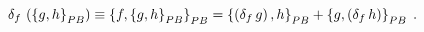 \begin{equation}
\delta_{f}\,\left(  \left\{  g,h\right\}  _{{\footnotesize PB}}\right)
\equiv\left\{  f,\left\{  g,h\right\}  _{{\footnotesize PB}}\right\}
_{{\footnotesize PB}}=\left\{  \left(  \delta_{f}\,g\right)  ,h\right\}
_{{\footnotesize PB}}+\left\{  g,\left(  \delta_{f}\,h\right)  \right\}
_{{\footnotesize PB}}\;.
\end{equation}

